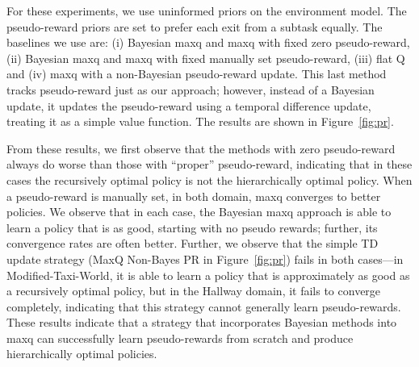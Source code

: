 For these experiments, we use uninformed priors on the
environment model. The pseudo-reward priors are set to prefer each
exit from a subtask equally. The baselines we
use are: (i) Bayesian {\sc maxq} and {\sc maxq} with fixed zero pseudo-reward, (ii)
Bayesian {\sc maxq} and {\sc maxq} with fixed manually set pseudo-reward, (iii)
flat Q and (iv) {\sc maxq} with a non-Bayesian pseudo-reward update. This last
method tracks pseudo-reward just as our approach; however, instead of
a Bayesian update, it updates the pseudo-reward using a temporal
difference update, treating it as a simple value function. The results
 are shown in Figure~\ref{fig:pr}.

From these results, we first observe that the methods with zero
pseudo-reward always do worse than those with ``proper'' pseudo-reward,
indicating that in these cases the recursively optimal policy is not
the hierarchically optimal policy. When a pseudo-reward is manually
set, in both domain, {\sc maxq} converges to better policies. We observe that
in each case, the Bayesian {\sc maxq} approach is able to learn a policy
that is as good, starting with no pseudo rewards; further, its
convergence rates are often better. Further, we observe
that the simple TD update strategy (MaxQ Non-Bayes PR in Figure~\ref{fig:pr}) fails in both cases---in {\sf Modified-Taxi-World}, it is able to learn a policy that is approximately as good
as a recursively optimal policy, but in the {\sf Hallway} domain, it
fails to converge completely, indicating that this strategy cannot
generally learn pseudo-rewards. These results indicate that a strategy
that incorporates Bayesian methods into {\sc maxq} can successfully learn
pseudo-rewards from scratch and produce hierarchically optimal policies.




